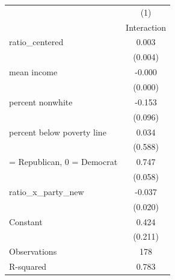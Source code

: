 \begin{tabular}{lc}
\toprule
                    &\multicolumn{1}{c}{(1)}\\
                    &\multicolumn{1}{c}{Interaction}\\
\midrule
ratio\_centered      &       0.003         \\
                    &     (0.004)         \\
\addlinespace
mean income         &      -0.000\sym{**} \\
                    &     (0.000)         \\
\addlinespace
percent nonwhite    &      -0.153         \\
                    &     (0.096)         \\
\addlinespace
percent below poverty line&       0.034         \\
                    &     (0.588)         \\
\addlinespace
1 = Republican, 0 = Democrat&       0.747\sym{***}\\
                    &     (0.058)         \\
\addlinespace
ratio\_x\_party\_new   &      -0.037\sym{*}  \\
                    &     (0.020)         \\
\addlinespace
Constant            &       0.424\sym{**} \\
                    &     (0.211)         \\
\midrule
Observations        &         178         \\
R-squared           &       0.783         \\
\bottomrule
\end{tabular}
